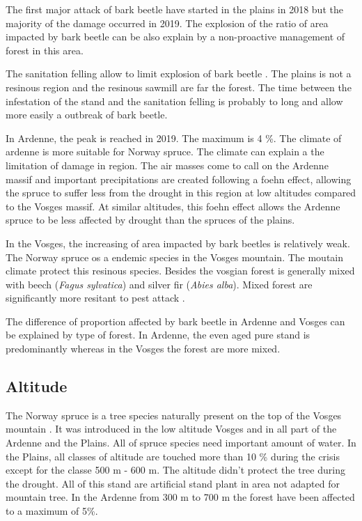\documentclass[3p,procedia]{elsarticle}
\begin{document}
The first major attack of bark beetle have started in the plains in 2018 but the majority of the damage occurred in 2019. 
The explosion of the ratio of area impacted by bark beetle can be also explain by a non-proactive management of forest in this area.

The sanitation felling allow to limit explosion of bark beetle \citep{stadelmann_effects_2013}.
The plains is not a resinous region and the resinous sawmill are far the forest. 
The time between the infestation of the stand and the sanitation felling is probably to long and allow more easily a outbreak of bark beetle.

In Ardenne, the peak is reached in 2019. The maximum is 4 \%. The climate of ardenne is more suitable for Norway spruce. 
The climate can explain a the limitation of damage in region. 
The air masses come to call on the Ardenne massif and important precipitations are created following a foehn effect, allowing the spruce to suffer less from the drought in this region at low altitudes compared to the Vosges massif. 
At similar altitudes, this foehn effect allows the Ardenne spruce to be less affected by drought than the spruces of the plains.

In the Vosges, the increasing of area impacted by bark beetles is relatively weak.
The Norway spruce os a endemic species in the Vosges mountain. 
The moutain climate protect this resinous species. 
Besides the vosgian forest is generally mixed with beech (\textit{Fagus sylvatica}) and  silver fir (\textit{Abies alba}). Mixed forest are significantly more resitant to pest attack \citep{jactel_2021}. 

The difference of proportion affected by bark beetle in Ardenne and Vosges can be explained by type of forest.
In Ardenne, the even aged pure stand is predominantly whereas in the Vosges  the forest are more mixed. 

\subsection{Altitude}


The Norway spruce is a tree species naturally present on the top of the Vosges mountain \citep{guinier_trois_1959}. 
It was introduced in the low altitude Vosges and in  all part of the Ardenne and the Plains. 
All of spruce species need important amount of water. 
In the Plains, all classes of altitude are touched more than 10 \% during the crisis except for the classe 500 m - 600 m. 
The altitude didn't protect the tree during the drought. 
All of this stand are artificial stand plant in area not adapted for mountain tree. In the Ardenne from 300 m to 700 m the forest have been affected to a maximum of 5\%. 
\end{document}
